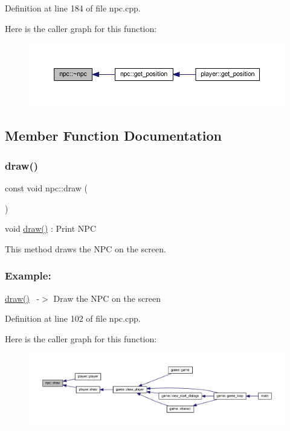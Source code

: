 Definition at line 184 of file npc.\+cpp.

Here is the caller graph for this function\+:
\nopagebreak
\begin{figure}[H]
\begin{center}
\leavevmode
\includegraphics[width=350pt]{classnpc_a77e7e3430ee5ff383f7a16b4b3e07fa1_icgraph}
\end{center}
\end{figure}


\subsection{Member Function Documentation}
\mbox{\label{classnpc_a1adf71c32d8948c9718568d1a2a6d9a7}} 
\subsubsection{\texorpdfstring{draw()}{draw()}}
{\footnotesize\ttfamily const void npc\+::draw (\begin{DoxyParamCaption}{ }\end{DoxyParamCaption})}



void \hyperlink{classnpc_a1adf71c32d8948c9718568d1a2a6d9a7}{draw()} \+: Print N\+PC 

This method draws the N\+PC on the screen. ~\newline
 \subsubsection*{Example\+: }

\hyperlink{classnpc_a1adf71c32d8948c9718568d1a2a6d9a7}{draw()}~\newline
-\/$>$ Draw the N\+PC on the screen 

Definition at line 102 of file npc.\+cpp.

Here is the caller graph for this function\+:
\nopagebreak
\begin{figure}[H]
\begin{center}
\leavevmode
\includegraphics[width=350pt]{classnpc_a1adf71c32d8948c9718568d1a2a6d9a7_icgraph}
\end{center}
\end{figure}
\mbox{\label{classnpc_a78bc2f0af05b44a6a8e71fa3853c0920}} 
